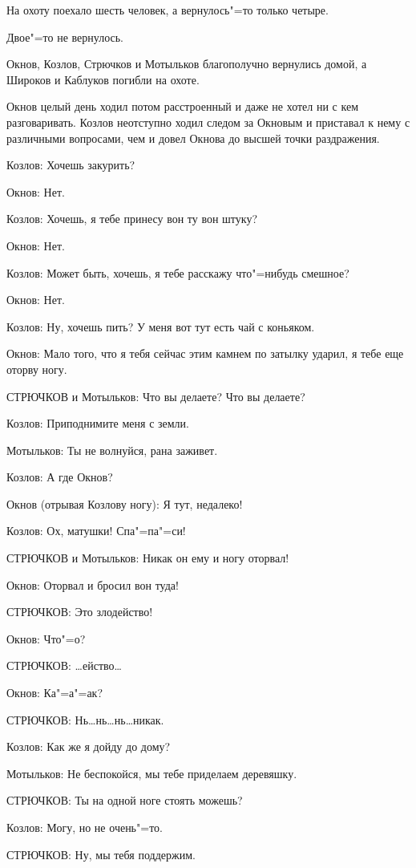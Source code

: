На охоту поехало шесть человек, а вернулось"=то только четыре.

Двое"=то не вернулось.

Окнов, Козлов, Стрючков и Мотыльков благополучно вернулись домой, а Широков и Каблуков погибли на охоте.

Окнов целый день ходил потом расстроенный и даже не хотел ни с кем разговаривать. Козлов неотступно ходил следом за Окновым и приставал к нему с различными вопросами, чем и довел Окнова до высшей точки раздражения.

Козлов: Хочешь закурить?

Окнов: Нет.

Козлов: Хочешь, я тебе принесу вон ту вон штуку?

Окнов: Нет.

Козлов: Может быть, хочешь, я тебе расскажу что"=нибудь смешное?

Окнов: Нет.

Козлов: Ну, хочешь пить? У меня вот тут есть чай с коньяком.

Окнов: Мало того, что я тебя сейчас этим камнем по затылку ударил, я тебе еще оторву ногу.

СТРЮЧКОВ и Мотыльков: Что вы делаете? Что вы делаете?

Козлов: Приподнимите меня с земли.

Мотыльков: Ты не волнуйся, рана заживет.

Козлов: А где Окнов?

Окнов (отрывая Козлову ногу): Я тут, недалеко!

Козлов: Ох, матушки! Спа"=па"=си!

СТРЮЧКОВ и Мотыльков: Никак он ему и ногу оторвал!

Окнов: Оторвал и бросил вон туда!

СТРЮЧКОВ: Это злодейство!

Окнов: Что"=о?

СТРЮЧКОВ: \dots ейство\dots

Окнов: Ка"=а"=ак?

СТРЮЧКОВ: Нь\dots нь\dots нь\dots никак.

Козлов: Как же я дойду до дому?

Мотыльков: Не беспокойся, мы тебе приделаем деревяшку.

СТРЮЧКОВ: Ты на одной ноге стоять можешь?

Козлов: Могу, но не очень"=то.

СТРЮЧКОВ: Ну, мы тебя поддержим.

